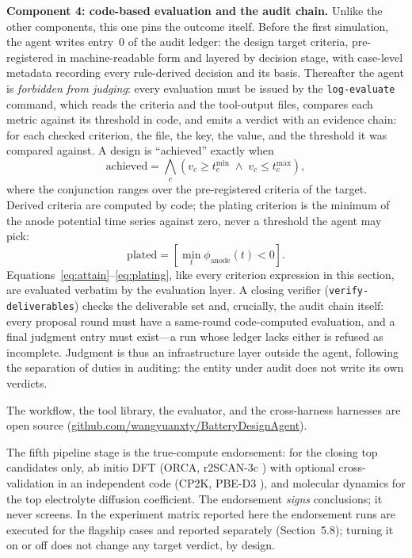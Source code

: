 \textbf{Component 4: code-based evaluation and the audit chain.} Unlike
the other components, this one pins the outcome itself. Before the first simulation, the
agent writes entry~0 of the audit ledger: the design target criteria,
pre-registered in machine-readable form and layered by decision stage, with
case-level metadata recording every rule-derived decision and its basis.
Thereafter the agent is \emph{forbidden from judging}: every evaluation must
be issued by the \texttt{log-evaluate} command, which reads the criteria and
the tool-output files, compares each metric against its threshold in code,
and emits a verdict with an evidence chain: for each checked criterion, the
file, the key, the value, and the threshold it was compared against.
A design is ``achieved'' exactly when
\begin{equation}
\label{eq:attain}
\text{achieved} = \bigwedge_{c} \left(v_c \geq t_c^{\min} \;\wedge\; v_c \leq t_c^{\max}\right),
\end{equation}
where the conjunction ranges over the pre-registered criteria of the
target. Derived criteria are computed by code; the plating criterion
is the minimum of the anode potential time series against zero, never a
threshold the agent may pick:
\begin{equation}
\label{eq:plating}
\text{plated} = \left[\min_t \phi_{\text{anode}}(t) < 0\right].
\end{equation}
Equations~\eqref{eq:attain}--\eqref{eq:plating}, like every criterion
expression in this section, are evaluated verbatim by the evaluation
layer. A closing verifier (\texttt{verify-deliverables}) checks the
deliverable set and, crucially, the audit chain itself: every proposal round
must have a same-round code-computed evaluation, and a final judgment entry
must exist---a run whose ledger lacks either is refused as incomplete.
Judgment is thus an infrastructure layer outside the agent, following the
separation of duties in auditing: the entity under audit does not write
its own verdicts.

The workflow, the tool library, the evaluator, and the
cross-harness harnesses are open source
(\href{https://github.com/wangyuanxty/BatteryDesignAgent}{github.com/wangyuanxty/BatteryDesignAgent}).

The fifth pipeline stage is the true-compute endorsement: for the closing
top candidates only, ab initio DFT (ORCA, r2SCAN-3c \cite{neese2022orca})
with optional cross-validation in an independent code (CP2K, PBE-D3
\cite{kuhne2020cp2k}), and molecular dynamics for the top electrolyte
diffusion coefficient. The endorsement \emph{signs} conclusions; it never
screens. In the experiment matrix reported here the endorsement runs are
executed for the flagship cases and reported separately (Section~5.8);
turning it on or off does not change any target verdict, by design.

